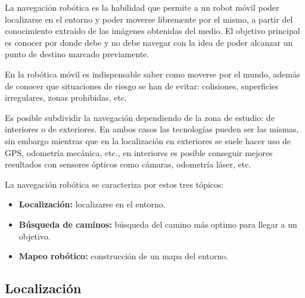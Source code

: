 
La navegación robótica es la habilidad que permite a un robot móvil poder
localizarse en el entorno y poder moverse libremente por el mismo, a partir del
conocimiento extraído de las imágenes obtenidas del medio. El objetivo principal
es conocer por donde debe y no debe navegar con la idea de poder alcanzar un
punto de destino marcado previamente. 

En la robótica móvil es indispensable saber como moverse por el mundo, además de
conocer que situaciones de riesgo se han de evitar: colisiones, superficies
irregulares, zonas prohibidas, etc. 

Es posible subdividir la navegación dependiendo de la zona de estudio: de
interiores o de exteriores. En ambos casos las tecnologías pueden ser las
mismas, sin embargo mientras que en la localización en exteriores se suele hacer
uso de GPS, odometría mecánica, etc., en interiores es posible conseguir mejores
resultados con sensores ópticos como cámaras, odometría láser, etc.

La navegación robótica se caracteriza por estos tres tópicos:

\begin{itemize}
  \item \textbf{Localización:} localizarse en el entorno. 
  \item \textbf{Búsqueda de caminos:} búsqueda del camino más optimo para llegar
  a un objetivo. 
  \item \textbf{Mapeo robótico:} construcción de un mapa del entorno. 
\end{itemize}%

\subsection{Localización}

